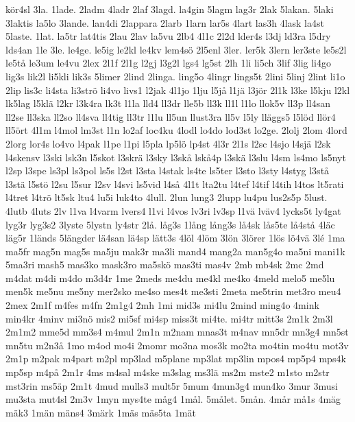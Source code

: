 {{k^^f6r4sl
3la.
1lade.
2ladm
4ladr
2laf
3lagd.
la4gin
5lagm
lag3r
2lak
5lakan.
5laki
3laktis
la5lo
3lande.
lan4di
2lappara
2larb
1larn
lar5s
4lart
las3h
4lask
la4st
5laste.
1lat.
la5tr
lat4tis
2lau
2lav
la5vu
2lb4
4l1c
2l2d
lder4s
l3dj
ld3ra
l5dry
lds4an
1le
3le.
le4ge.
le5ig
le2kl
le4kv
lem4s^^f6
2l5enl
3ler.
ler5k
3lern
ler3ste
le5s2l
le5t^^e5
le3um
le4vu
2lex
2l1f
2l1g
l2gj
l3g2l
lgs4
lg5st
2lh
1li
li5ch
3lif
3lig
li4go
lig3s
lik2l
li5kli
lik3s
5limer
2lind
2linga.
ling5o
4lingr
lings5t
2lini
5linj
2lint
li1o
2lip
lis3c
li4sta
li3str^^f6
li4vo
livs1
l2jak
4l1jo
1lju
l5j^^e5
l1j^^e4
l3j^^f6r
2l1k
l3ke
l5kju
l2kl
lk5lag
l5kl^^e4
l2kr
l3k4ra
lk3t
l1la
lld4
ll3dr
lle5b
ll3k
ll1l
l1lo
llok5v
ll3p
ll4san
ll2se
ll3ska
ll2so
ll4sva
ll4tig
ll3tr
l1lu
ll5un
llust3ra
ll5v
l5ly
ll^^e4ggs5
l5l^^f6d
ll^^f6r4
ll5^^f6rt
4l1m
l4mol
lm3st
l1n
lo2af
loc4ku
4lodl
lo4do
lod3st
lo2ge.
2lolj
2lom
4lord
2lorg
lor4s
lo4vo
l4pak
l1pe
l1pi
l5pla
lp5l^^f6
lp4st
4l3r
2l1s
l2sc
l4sjo
l4sj^^e4
l2sk
l4skensv
l3ski
lsk3n
l5skot
l3skr^^e4
l3sky
l3sk^^e5
lsk^^e54p
l3sk^^e4
l3slu
l4sm
ls4mo
ls5nyt
l2sp
l3spe
ls3pl
ls3pol
ls5s
l2st
l3sta
l4stak
ls4te
ls5ter
l3sto
l3sty
l4styg
l3st^^e5
l3st^^e4
l5st^^f6
l2su
l5sur
l2sv
l4svi
ls5vid
l4s^^e5
4l1t
lta2tu
l4tef
l4tif
l4tih
l4tos
lt5rati
l4tret
l4tr^^f6
lt5sk
ltu4
lu5i
luk4to
4lull.
2lun
lung3
2lupp
lu4pu
lus2s5p
5lust.
4lutb
4luts
2lv
l1va
l4varm
lvers4
l1vi
l4vos
lv3ri
lv3sp
l1v^^e4
lv^^e4v4
lycks5t
ly4gat
lyg3r
lyg3s2
3lyste
5lystn
ly4str
2l^^e5.
l^^e5g3s
1l^^e5ng
l^^e5ng3s
l^^e54sk
l^^e5s5te
l^^e54st^^e5
4l^^e4c
l^^e4g5r
1l^^e4nds
5l^^e4ngder
l^^e44san
l^^e44sp
l^^e4tt3s
4l^^f6l
4l^^f6m
3l^^f6n
3l^^f6rer
1l^^f6s
l^^f64v^^e4
3l^^e9
1ma
ma5fr
mag5n
mag5s
ma5ju
mak3r
ma3li
mand4
mang2a
man5g4o
ma5ni
mani1k
5ma3ri
mash5
mas3ko
mask3ro
ma5sk^^f6
mas3ti
mas4v
2mb
mb4sk
2mc
2md
m4dat
m4di
m4do
m3d4r
1me
2meds
me4du
me4kl
me4ko
4meld
melo5
me5lu
men5k
me5nu
me5ny
mer2sko
me4so
mes4t
me3sti
2meta
me5trin
met3ro
meu4
2mex
2m1f
m4fes
m4fn
2m1g4
2mh
1mi
mid3s
mi4lu
2mind
ming4o
4mink
min4kr
4minv
mi3n^^f6
mis2
mi5sf
mi4sp
miss3t
mi4te.
mi4tr
mitt3s
2m1k
2m3l
2m1m2
mme5d
mm3s4
m4mul
2m1n
m2nam
mnas3t
m4nav
mn5dr
mn3g4
mn5st
mn5tu
m2n3^^e5
1mo
m4od
mo4i
2momr
mo3na
mos3k
mo2ta
mo4tin
mo4tu
mot3v
2m1p
m2pak
m4part
m2pl
mp3lad
m5plane
mp3lat
mp3lin
mpos4
mp5p4
mps4k
mp5sp
m4p^^e5
2m1r
4ms
m4sal
m4ske
m3slag
ms3l^^e4
ms2m
mste2
m1sto
m2str
mst3rin
ms5^^e4p
2m1t
4mud
mulls3
mult5r
5mum
4mun3g4
mun4ko
3mur
3musi
mu3sta
mut4sl
2m3v
1myn
mys4te
m^^e5g4
1m^^e5l.
5m^^e5let.
5m^^e5n.
4m^^e5r
m^^e51s
4m^^e4g
m^^e4k3
1m^^e4n
m^^e4ns4
3m^^e4rk
1m^^e4s
m^^e4s5ta
1m^^e4t
}}

